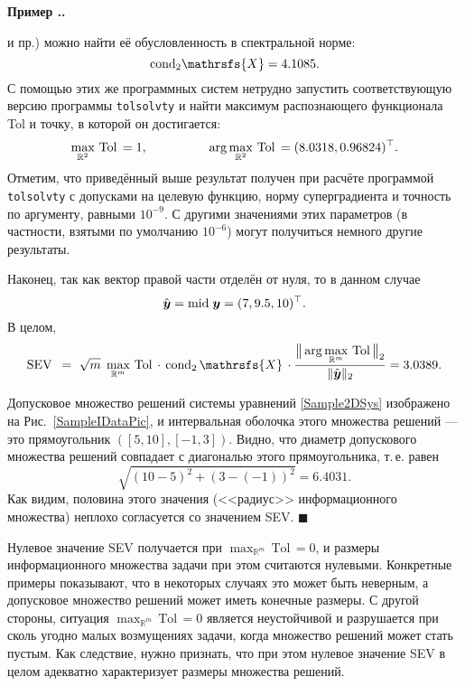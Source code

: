 \documentclass[a5paper,openany]{book}
\newcommand{\mbf}[1]{\protect\text{\boldmath$#1$}}
\newcommand{\mbb}{\mathbb}
\newcommand{\m}{\mathrm{mid}\;}
\newcommand{\Tol}{\mathrm{Tol}\,}
\newcommand{\SEV}{\mathrm{SEV}\,}
\newcommand{\calX}{\mathrsfs{X}}
\newcommand{\cond}{\mathrm{cond}}
\newcounter{ExmpNum}[section]
\renewcommand{\theExmpNum}{\thesection.\arabic{ExmpNum}}
\newenvironment{example}%
  {\refstepcounter{ExmpNum}%
  \par\addvspace{\medskipamount} 
  \noindent\textbf{Пример {\theExmpNum}.}
  }%
  {\hfill$\blacksquare$\par\medskip}
\begin{document}
\begin{example}
и пр.) можно найти её обусловленность в спектральной норме: 
\begin{equation*} 
\cond_{2}\calX = 4.1085. 
\end{equation*} 
С помощью этих же программных систем нетрудно запустить соответствующую версию программы 
\texttt{tolsolvty} и найти максимум распознающего функционала Tol и точку, в которой 
он  достигается: 
\begin{equation*} 
\max_{\mbb{R}^2}\,\Tol = 1, \hspace{17mm} 
   \arg\max_{\mbb{R}^2} \,\Tol = (8.0318, 0.96824)^{\top}. 
\end{equation*} 
Отметим, что приведённый выше результат получен при расчёте программой \texttt{tolsolvty} 
с допусками на целевую функцию, норму суперградиента и точность по аргументу, равными 
$10^{-9}$. С другими значениями этих параметров (в частности, взятыми по умолчанию 
$10^{-6}$) могут получиться немного другие результаты. 
  
Наконец, так как вектор правой части отделён от нуля, то в данном случае 
\begin{equation*} 
\hat{\mbf{y}} = \m\mbf{y} = (7, 9.5, 10)^\top. 
\end{equation*} 
В целом, 
\begin{equation*} 
\SEV\  = \  \sqrt{m}\;\max_{\mbb{R}^m}\,\Tol \cdot 
   \,\cond_{2}\,\calX\, \cdot \frac{\displaystyle 
   \bigl\|\,\arg\max_{\mbb{R}^m} \,\Tol\bigr\|_{2}}{\|\hat{\mbf{y}}\|_2} = 3.0389. 
\end{equation*} 
    
Допусковое множество решений системы уравнений \eqref{Sample2DSys} изображено 
на Рис.~\ref{SampleIDataPic}, и интервальная оболочка этого множества решений 
--- это прямоугольник $([5, 10], [-1, 3])$. Видно, что диаметр допускового 
множества решений совпадает с диагональю этого прямоугольника, т.\,е. равен 
\begin{equation*} 
\sqrt{(10 - 5)^2 + (3 - (-1))^2} = 6.4031. 
\end{equation*} 
Как видим, половина этого значения (<<радиус>> информационного множества) неплохо 
согласуется со значением SEV. 
\end{example} 
   
Нулевое значение SEV получается при $\max_{\mbb{R}^m}\,\Tol = 0$, и размеры 
информационного множества задачи при этом считаются нулевыми. Конкретные примеры 
показывают, что в некоторых случаях это может быть неверным, а допусковое множество 
решений может иметь конечные размеры. С другой стороны, ситуация $\max_{\mbb{R}^m}\,
\Tol = 0$ является неустойчивой и разрушается при сколь угодно малых возмущениях 
задачи, когда множество решений может стать пустым. Как следствие, нужно признать, 
что при этом нулевое значение SEV в целом адекватно характеризует размеры множества 
решений. 
    
\end{document}
